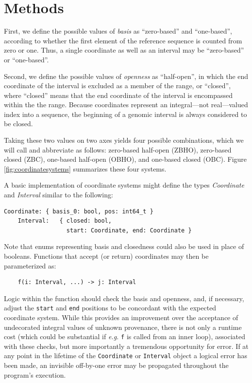 \documentclass[12pt]{article}
\begin{document}
\section*{Methods}  %

First, we define the possible values of \textit{basis} as ``zero-based'' and ``one-based'', according to whether the first element of the reference sequence is counted from zero or one. Thus, a single coordinate as well as an interval may be ``zero-based'' or ``one-based''.

Second, we define the possible values of \textit{openness} as ``half-open'', in which the end coordinate of the interval is excluded as a member of the range,  or ``closed'', where ``closed'' means that the end coordinate of the interval is encompassed within the the range. Because coordinates represent an integral---not real---valued index into a sequence, the beginning of a genomic interval is always considered to be closed.

Taking these two values on two axes yields four possible combinations, which we will call and abbreviate as follows: zero-based half-open (ZBHO), zero-based closed (ZBC), one-based half-open (OBHO), and one-based closed (OBC). Figure \ref{fig:coordinatesystems} summarizes these four systems.

A basic implementation of coordinate systems might define the types \textit{Coordinate} and \textit{Interval} similar to the following:\\

\begin{lstlisting}[frame=none,basicstyle=\ttfamily\small]
    Coordinate: { basis_0: bool, pos: int64_t }
    Interval:   { closed: bool,
                  start: Coordinate, end: Coordinate }
\end{lstlisting}

Note that enums representing basis and closedness could also be used in place of booleans. Functions that accept (or return) coordinates may then be parameterized as:

\begin{verbatim}
    f(i: Interval, ...) -> j: Interval
\end{verbatim}

Logic within the function should check the basis and openness, and, if necessary, adjust the \texttt{start} and \texttt{end} positions to be concordant with the expected coordinate system. While this provides an improvement over the acceptance of undecorated integral values of unknown provenance, there is not only a runtime cost (which could be substantial if \textit{e.g.} \texttt{f} is called from an inner loop), associated with these checks, but more importantly a tremendous opportunity for error. If at any point in the lifetime of the \texttt{Coordinate} or \texttt{Interval} object a logical error has been made, an invisible off-by-one error may be propagated throughout the program's execution.
\end{document}

